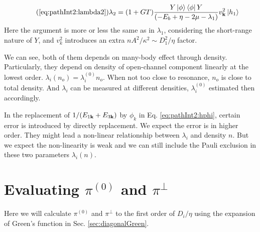 \begin{equation}\tag{\ref{eq:pathInt2:lambda2}}
\lambda_{2}=(1+GT)\frac{Y\ket{\phi}\bra{\phi}{Y}}{\br{-E_{b}+\eta-2\mu-\lambda_{1}}}v_{\vk}^{2}\ket{{h_{1}}}
\end{equation}
Here the argument is more or less the same as in $\lambda_{1}$, considering the short-range nature of $Y$, and $v_{k}^{2}$ introduces an extra $nA^{2}/\kappa^{2}\sim{}D_{1}^{2}/\eta$ factor.  

We can see, both of them depends on many-body effect through density.  Particularly, they depend on density of open-channel component linearly at the lowest order.  $\lambda_{i}(n_o)=\lambda_{i}^{(0)}n_o$.  When not too close to resonance, $n_o$ is close to total density.  And $\lambda_{i}$ can be measured at different densities,  $\lambda_{i}^{(0)}$ estimated then accordingly. 

In the replacement of $1/(E_{1\mathbf{k}}+E_{3\mathbf{k}})$ by $\phi_{k}$ in Eq. \ref{eq:pathInt2:hphi}, certain error is introduced by directly replacement.  We expect the error is in higher order.  They might lead a non-linear relationship between $\lambda_{i}$ and density $n$.  But we expect the non-linearity is weak and we can still include the Pauli exclusion in these two parameters $\lambda_{i}(n)$.




\section{Evaluating $\pi^{(0)}$ and $\pi^{\perp}$\label{sec:calculatePi}}
Here we will calculate $\pi^{(0)}$ and $\pi^{\perp}$ to the first order of $D_i/\eta$ using the expansion of Green's function in Sec. \ref{sec:diagonalGreen}.

